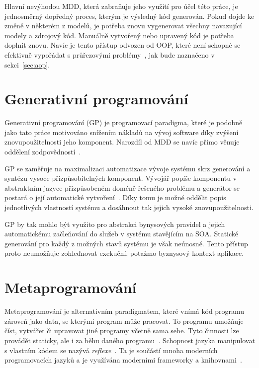 Hlavní nevýhodou \gls{MDD}, která zabraňuje jeho využití pro účel této práce,
je jednosměrný dopředný proces, kterým je výsledný kód generován. Pokud dojde ke změně v
některém z modelů, je potřeba znovu vygenerovat všechny navazující modely a zdrojový kód.
Manuálně vytvořený nebo upravený kód je potřeba doplnit znovu. Navíc je tento přístup odvozen od
\gls{OOP}, které není schopné se efektivně vypořádat s průřezovými problémy~\cite{cemus2014aspect,
kennard2009separation}, jak bude naznačeno v sekci~\ref{sec:aop}.

\section{Generativní programování}

Generativní programování (\gls{GP}) je programovací paradigma, které je podobně jako
tato práce motivováno snížením nákladů na vývoj software díky zvýšení znovupoužitelnosti
jeho komponent. Narozdíl od \gls{MDD} se navíc přímo věnuje oddělení
zodpovědností~\cite{cemus2017separation, czarnecki2000generative}.

\gls{GP} se zaměřuje na maximalizaci automatizace vývoje systému
skrz generování a syntézu vysoce přizpůsobitelných komponent. Vývojář
popíše komponentu v abstraktním jazyce přizpůsobeném doméně řešeného
problému a generátor se postará o její automatické vytvoření~\cite{czarnecki2000generative}.
Díky tomu je možné oddělit popis jednotlivých vlastností systému a dosáhnout tak
jejich vysoké znovupoužitelnosti.

\gls{GP} by tak mohlo být využito pro abstrakci bynysových pravidel a jejich
automatickému začleňování do služeb v systému stavějícím na \gls{SOA}.
Statické generování pro každý z možných stavů systému je však neúnosné. Tento
přístup proto neumožňuje zohleďnovat exekuční, potažmo byznysový kontext aplikace.

\section{Metaprogramování}

Metaprogramování je alternativním paradigmatem, které vnímá kód programu
zároveň jako data, se kterými program může pracovat. To programu umožňuje
číst, vytvářet či upravovat jiné programy včetně sama sebe. Tyto činnosti
lze provádět staticky, ale i za běhu daného programu~\cite{czarnecki2000generative, sheard2001accomplishments}.
Schopnost jazyka manipulovat s vlastním kódem se nazývá \textit{reflexe}~\cite{sobel1996introduction}.
Ta je součástí mnoha moderních programovacích jazyků a je využívána moderními frameworky a
knihovnami~\cite{forman2004java, vandevoorde2002c++}.

